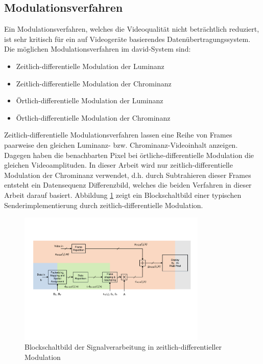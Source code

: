 \subsection{Modulationsverfahren}

Ein Modulationsverfahren, welches die Videoqualität nicht beträchtlich reduziert, ist sehr kritisch für ein auf Videogeräte basierendes Datenübertragungssystem. Die möglichen Modulationsverfahren im \gls{david}-System sind:
\begin{itemize}
	\item Zeitlich-differentielle Modulation der Luminanz
	\item Zeitlich-differentielle Modulation der Chrominanz
	\item Örtlich-differentielle Modulation der Luminanz
	\item Örtlich-differentielle Modulation der Chrominanz
\end{itemize}

Zeitlich-differentielle Modulationsverfahren lassen eine Reihe von Frames paarweise den gleichen Luminanz- bzw. Chrominanz-Videoinhalt anzeigen. Dagegen haben die benachbarten Pixel bei örtliche-differentielle Modulation die gleichen Videoamplituden. In dieser Arbeit wird nur zeitlich-differentielle Modulation der Chrominanz verwendet, d.h. durch Subtrahieren dieser Frames entsteht ein Datensequenz Differenzbild, welches die beiden Verfahren in dieser Arbeit darauf basiert. Abbildung \ref{fig:David3} zeigt ein Blockschaltbild einer typischen Senderimplementierung durch zeitlich-differentielle Modulation.

\begin{figure}[htb]
	\centering 
	\includegraphics[keepaspectratio,width=0.8\textwidth]{images/2_DaViD/2.pdf}
	\caption{Blockschaltbild der Signalverarbeitung in zeitlich-differentieller Modulation}
	\label{fig:David3}
\end{figure}

